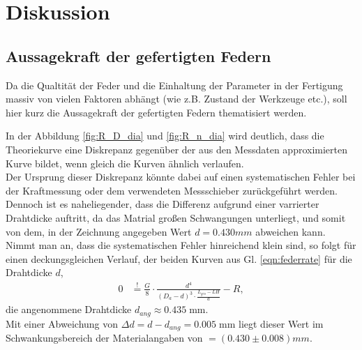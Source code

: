 \newpage
\section{Diskussion}
\subsection{Aussagekraft der gefertigten Federn}
Da die Qualtität der Feder und die Einhaltung der Parameter in der Fertigung 
massiv von vielen Faktoren abhängt (wie z.B. Zustand der Werkzeuge etc.), soll hier kurz
die Aussagekraft der gefertigten Federn thematisiert werden.\newline

In der Abbildung \ref{fig:R_D_dia} und \ref{fig:R_n_dia} wird deutlich, dass die
Theoriekurve eine Diskrepanz gegenüber der aus den Messdaten approximierten 
Kurve bildet, wenn gleich die Kurven ähnlich verlaufen.\\
Der Ursprung dieser Diskrepanz könnte dabei auf einen systematischen Fehler
bei der Kraftmessung oder dem verwendeten Messschieber zurückgeführt werden. Dennoch ist es naheliegender, dass die Differenz
aufgrund einer varrierter Drahtdicke auftritt, da das Matrial großen Schwangungen unterliegt, 
und somit von dem, in der Zeichnung angegeben Wert $d=0.430\si{mm}$ abweichen kann.\\
Nimmt man an, dass die systematischen Fehler hinreichend klein sind, so folgt für einen deckungsgleichen Verlauf, der beiden Kurven aus Gl. \ref{eqn:federrate} für die Drahtdicke $d$,
\begin{align*}
    0&\overset{\text{!}}{=}\frac{G}{8} \cdot \frac{d^4}{(D_a-d)^3\cdot \frac{L_{ges}-LH}{d}}-R,
\end{align*}
die angenommene Drahtdicke $d_{ang} \approx 0.435\;$mm.\\
Mit einer Abweichung von $\Delta d=d-d_{ang}=0.005\;$mm liegt dieser Wert im Schwankungsbereich
der Materialangaben von $=(0.430\pm 0.008)\si{mm}$.


